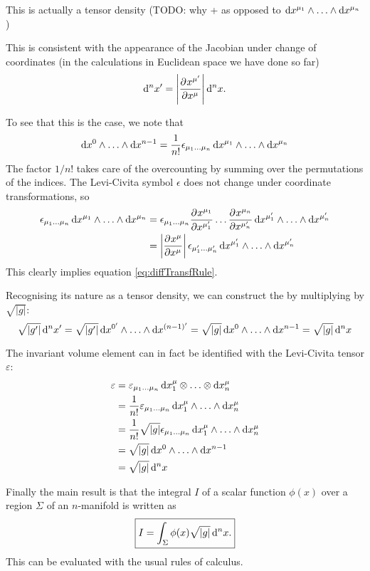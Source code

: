 This is actually a tensor density (TODO: why + as opposed to $\operatorname{d \!}{x^{\mu_1}}\wedge \ldots \wedge \operatorname{d \!}{x^{\mu_n}}$)

This is consistent with the appearance of the Jacobian under change of coordinates (in the calculations in Euclidean space we have done so far) 
\[ \operatorname{d \!}{^nx'} = \left| \frac{\partial{^{}}x^{\mu'}}{\partial{{x^\mu}^{}}} \right|\operatorname{d \!}{^nx}. \]

To see that this is the case, we note that
\[ \operatorname{d \!}{x^0}\wedge \ldots \wedge \operatorname{d \!}{x^{n-1}} = \frac{1}{n!}\epsilon_{\mu_1\ldots\mu_n}\operatorname{d \!}{x^{\mu_1}}\wedge \ldots \wedge \operatorname{d \!}{x^{\mu_n}} \]
The factor $1/n!$ takes care of the overcounting by summing over the permutations of the indices. The Levi-Civita symbol $\epsilon$ does not change under coordinate transformations, so
\begin{align}
\epsilon_{\mu_1\ldots\mu_n}\operatorname{d \!}{x^{\mu_1}}\wedge \ldots \wedge \operatorname{d \!}{x^{\mu_n}} &= \epsilon_{\mu_1\ldots\mu_n}  \frac{\partial{^{}}x^{\mu_1}}{\partial{{x^{\mu'_1}}^{}}} \ldots \frac{\partial{^{}}x^{\mu_n}}{\partial{{x^{\mu'_n}}^{}}} \operatorname{d \!}{x^{\mu'_1}}\wedge \ldots \wedge \operatorname{d \!}{x^{\mu'_n}} \\
&= \left| \frac{\partial{^{}}x^\mu}{\partial{{x^{\mu}}^{}}} \right|\epsilon_{\mu'_1\ldots\mu'_n}\operatorname{d \!}{x^{\mu'_1}}\wedge \ldots \wedge \operatorname{d \!}{x^{\mu'_n}}
\end{align}
This clearly implies equation \ref{eq:diffTransfRule}.

Recognising its nature as a tensor density, we can construct the  by multiplying by $\sqrt{|g|}$:
\[ \sqrt{|g'|}\operatorname{d \!}{^nx'} = \sqrt{|g'|}\operatorname{d \!}{x^{0'}}\wedge \ldots \wedge \operatorname{d \!}{x^{(n-1)' }} = \sqrt{|g|}\operatorname{d \!}{x^0}\wedge \ldots \wedge \operatorname{d \!}{x^{n-1}} = \sqrt{|g|}\operatorname{d \!}{^nx} \]

The invariant volume element can in fact be identified with the Levi-Civita tensor $\varepsilon$:
\begin{align}
\varepsilon &= \varepsilon_{\mu_1\ldots\mu_n}\diff{x^\mu_1}\otimes \ldots\otimes \diff{x^\mu_n} \\
&= \frac{1}{n!}\varepsilon_{\mu_1\ldots\mu_n}\diff{x^\mu_1}\wedge \ldots\wedge \diff{x^\mu_n} \\
&= \frac{1}{n!}\sqrt{|g|}\epsilon_{\mu_1\ldots\mu_n}\diff{x^\mu_1}\wedge \ldots\wedge \diff{x^\mu_n} \\
&= \sqrt{|g|}\diff{x^0}\wedge \ldots\wedge \diff{x^{n-1}} \\
&= \sqrt{|g|}\diff{^nx}
\end{align}

Finally the main result is that the integral $I$ of a scalar function $\phi(x)$ over a region $\Sigma$ of an $n$-manifold is written as
\[ \boxed{I = \int_\Sigma\phi(x) \sqrt{|g|} \operatorname{d \!}{^n}x. } \]
This can be evaluated with the usual rules of calculus.

